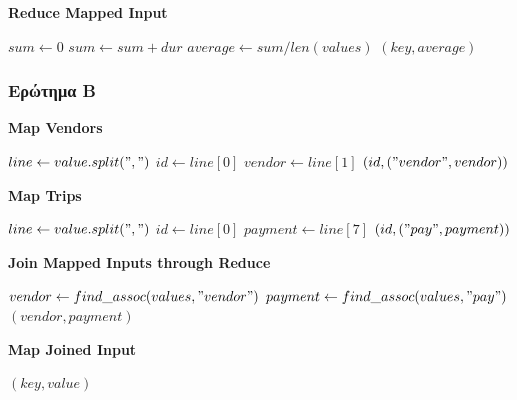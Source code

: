 \documentclass{ntua}
\begin{document}
\begin{algorithm}[H]
\caption*{\bfseries{Reduce Mapped Input}}
\begin{algorithmic}[1]
	\State $sum\gets 0$
		\State $sum \gets sum + dur$
	\EndFor
	\State $average \gets sum / len(values)$
	\Emit $(key, average)$
	\EndFunction
\end{algorithmic}
\end{algorithm}

\subsubsection{Ερώτημα Β}

\begin{algorithm}[H]
\caption*{\bfseries{Map Vendors}}
\begin{algorithmic}[1]
	\State $line \gets value.split(",")$
	\State $id \gets line[0]$
	\State $vendor \gets line[1]$
	\Emit $(id, ("vendor", vendor))$
	\EndFunction
\end{algorithmic}
\end{algorithm}

\begin{algorithm}[H]
\caption*{\bfseries{Map Trips}}
\begin{algorithmic}[1]
	\State $line \gets value.split(",")$
	\State $id \gets line[0]$
	\State $payment \gets line[7]$
	\Emit $(id, ("pay", payment))$
	\EndFunction
\end{algorithmic}
\end{algorithm}

\begin{algorithm}[H]
\caption*{\bfseries{Join Mapped Inputs through Reduce}}
\begin{algorithmic}[1]
	\State $vendor \gets find\_assoc(values, "vendor")$
	\State $payment \gets find\_assoc(values, "pay")$
	\Emit $(vendor, payment)$
	\EndFunction
\end{algorithmic}
\end{algorithm}

\begin{algorithm}[H]
\caption*{\bfseries{Map Joined Input}}
\begin{algorithmic}[1]
	\Emit $(key, value)$
	\EndFunction
\end{algorithmic}
\end{algorithm}
\end{document}
